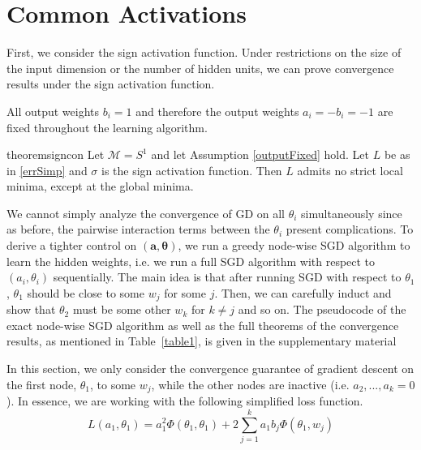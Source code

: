 \section{Common Activations}
First, we consider the sign activation function. Under restrictions on the size of the input dimension or the number of hidden units, we can prove convergence results under the sign activation function. 

\begin{assumption}
\label{outputFixed}
All output weights $b_i = 1$ and therefore the output weights  $a_i = - b_i = -1$ are fixed throughout the learning algorithm. 
\end{assumption}

\begin{restatable}{theorem}{signcon}\label{signCon}
Let $\mathcal{M} = S^1$ and let Assumption \ref{outputFixed} hold. Let $L$ be as in \eqref{errSimp} and $\sigma$ is the sign activation function. Then $L$ admits no strict local minima, except at the global minima.
\end{restatable}


We cannot simply analyze the convergence of GD
on all $\theta_i$ simultaneously since as before, the pairwise
interaction terms between the $\theta_i$ present complications. To
derive a tighter control on $(\boldsymbol{a,\theta})$, we run a greedy
node-wise SGD algorithm to learn the hidden weights, i.e. we run a
full SGD algorithm with respect to $(a_i,\theta_i)$ sequentially. The
main idea is that after running SGD with respect to $\theta_1$,
$\theta_1$ should be close to some $w_j$ for some $j$. Then, we can
carefully induct and show that $\theta_2$ must be some other $w_k$ for
$k\neq j$ and so on. The pseudocode of the exact node-wise SGD
algorithm as well as the full theorems of the convergence results, as
mentioned in Table~\ref{table1}, is given in the supplementary
material

In this section, we only consider the convergence guarantee of gradient descent on the first node, $\theta_1$, to some $w_j$, while the other nodes are inactive (i.e. $a_2,...,a_k = 0$). In essence, we are working with the following simplified loss function.
%
\begin{equation}\label{errLossUnit}
L(a_1,\theta_1) =  a_1^2 \Phi(\theta_1,\theta_1)  + 2\sum_{j=1}^k a_1b_j \Phi(\theta_1,w_j)
\end{equation}


